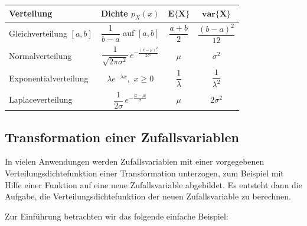 \begin{bemerkung}
\renewcommand{\arraystretch}{1.6}
\begin{center}
\begin{tabular}{lccc}
  \hline
  \textbf{Verteilung} & \textbf{Dichte $p_X(x)$} & $\mathbf{E\{X\}}$ & $\mathbf{var\{X\}}$ \\
  \hline
  Gleichverteilung $[a,b]$ & $\dfrac{1}{b-a}$ auf $[a,b]$ & $\dfrac{a+b}{2}$ & $\dfrac{(b-a)^2}{12}$ \\
  Normalverteilung & $\dfrac{1}{\sqrt{2\pi\sigma^2}}\,e^{-\frac{(x-\mu)^2}{2\sigma^2}}$ & $\mu$ & $\sigma^2$ \\
  Exponentialverteilung & $\lambda e^{-\lambda x}$,\ $x \geq 0$ & $\dfrac{1}{\lambda}$ & $\dfrac{1}{\lambda^2}$ \\
  Laplaceverteilung & $\dfrac{1}{2\sigma}\,e^{-\frac{|x-\mu|}{\sigma}}$ & $\mu$ & $2\sigma^2$ \\
  \hline
\end{tabular}
\end{center}
\renewcommand{\arraystretch}{1}
\end{bemerkung}

\subsection{Transformation einer Zufallsvariablen}
\label{sec:transformation-zv}

In vielen Anwendungen werden Zufallsvariablen mit einer vorgegebenen Verteilungsdichtefunktion einer Transformation unterzogen, zum Beispiel mit Hilfe einer Funktion auf eine neue Zufallsvariable abgebildet. Es entsteht dann die Aufgabe, die Verteilungsdichtefunktion der neuen Zufallsvariable zu berechnen.

Zur Einführung betrachten wir das folgende einfache Beispiel:

